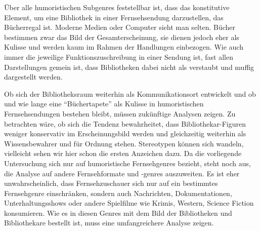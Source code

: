 Über alle humoristischen Subgenres feststellbar ist, dass das
konstitutive Element, um eine Bibliothek in einer Fernsehsendung
darzustellen, das Bücherregal ist. Moderne Medien oder Computer sieht
man selten. Bücher bestimmen zwar das Bild der Gesamterscheinung, sie
dienen jedoch eher als Kulisse und werden kaum im Rahmen der Handlungen
einbezogen. Wie auch immer die jeweilige Funktionszuschreibung in einer
Sendung ist, fast allen Darstellungen gemein ist, dass Bibliotheken
dabei nicht als verstaubt und muffig dargestellt werden.

Ob sich der Bibliotheksraum weiterhin als Kommunikationsort entwickelt
und ob und wie lange eine \enquote{Büchertapete} als Kulisse in
humoristischen Fernsehsendungen bestehen bleibt, müssen zukünftige
Analysen zeigen. Zu betrachten wäre, ob sich die Tendenz bewahrheitet,
dass Bibliothekar-Figuren weniger konservativ im Erscheinungsbild werden
und gleichzeitig weiterhin als Wissensbewahrer und für Ordnung stehen.
Stereotypen können sich wandeln, vielleicht sehen wir hier schon die
ersten Anzeichen dazu. Da die vorliegende Untersuchung sich nur auf
humoristische Fernsehgenres bezieht, steht noch aus, die Analyse auf
andere Fernsehformate und -genres auszuweiten. Es ist eher
unwahrscheinlich, dass Fernsehzuschauer sich nur auf ein bestimmtes
Fernsehgenre einschränken, sondern auch Nachrichten, Dokumentationen,
Unterhaltungsshows oder andere Spielfilme wie Krimis, Western, Science
Fiction konsumieren. Wie es in diesen Genres mit dem Bild der
Bibliotheken und Bibliothekare bestellt ist, muss eine umfangreichere
Analyse zeigen.
